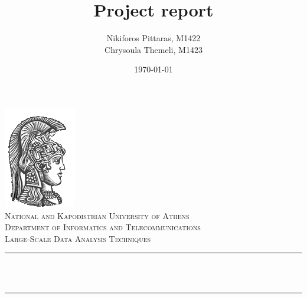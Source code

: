 \documentclass[12pt]{article}
\title{Project report}   %
\author{ Nikiforos Pittaras, M1422 \\ 
		 Chrysoula Themeli, M1423}                               %
\date{\today}  %
\makeatletter
\let\thetitle\@title
\let\theauthor\@author
\let\thedate\@date
\makeatother
\begin{document}
	
	
	\begin{titlepage}
		\centering
		\vspace*{0.5 cm}
		\includegraphics[scale = 0.75]{ekpalogo.png}\\[1.0 cm]   %
		\textsc{\LARGE National and Kapodistrian University of Athens}\\[2.0 cm]   %
		\textsc{\Large Department of Informatics and Telecommunications}\\[0.5 cm]               %
		\textsc{\large Large-Scale Data Analysis Techniques}\\[0.5 cm] %
		\rule{\linewidth}{0.2 mm} \\[0.4 cm]
		{ \huge \bfseries \thetitle}\\
		\rule{\linewidth}{0.2 mm} \\[1.5 cm]
		
		\begin{minipage}{0.4\textwidth}
			\begin{center} \large
				\theauthor
			\end{center}
		\end{minipage}~
		\begin{minipage}{0.4\textwidth}
		\end{minipage}\\[2 cm]
		
		{\large \thedate}\\[2 cm]
		
		\vfill
		
	\end{titlepage}
	
	
	\tableofcontents
    \newpage
	\listoffigures
	\newpage
	
\end{document}
